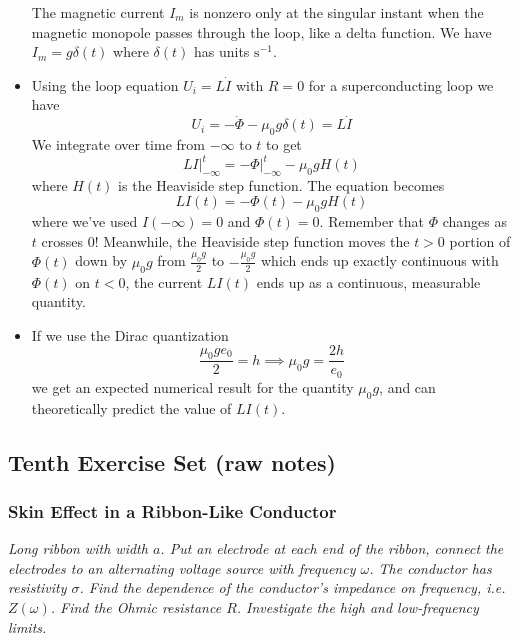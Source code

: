 \documentclass[11pt, a4paper]{article}
\renewcommand{\vec}[1]{\bm{#1}} %
\newcommand{\mm}{\mu_{0}}  %
\newcommand{\m}{\vec{m}}  %
\begin{document}
\begin{itemize}
	The magnetic current $ I_{m} $ is nonzero only at the singular instant when the magnetic monopole passes through the loop, like a delta function. We have $ I_{m} = g \delta (t) $ where $ \delta(t) $ has units $ \si{\second^{-1}} $. 
	
	\item Using the loop equation $ U_{i} = L \dot{I} $ with $ R = 0 $ for a superconducting loop we have
	\begin{equation*}
		U_{i} = - \dot{\Phi} - \mm g \delta (t) = L \dot{I}
	\end{equation*}
	We integrate over time from $ -\infty $ to $ t $ to get
	\begin{equation*}
		LI\big |_{-\infty}^{t} = - \Phi |_{-\infty}^{t} - \mm g H(t)
	\end{equation*}
	where $ H(t) $ is the Heaviside step function. The equation becomes
	\begin{equation*}
		LI(t) = - \Phi(t)  - \mm gH(t)
	\end{equation*}
	where we've used $ I(-\infty) = 0 $ and $ \Phi(t) = 0$. Remember that $ \Phi $ changes as $ t $ crosses $ 0 $! Meanwhile, the Heaviside step function moves the $ t > 0 $ portion of $ \Phi(t) $ down by $ \mm g $ from $ \frac{\mm g}{2} $ to $ -\frac{\mm g}{2} $ which ends up exactly continuous with $ \Phi(t) $ on $ t < 0 $, the current $ LI(t) $ ends up as a continuous, measurable quantity.
	
	\item If we use the Dirac quantization 
	\begin{equation*}
		\frac{\mm g e_{0}}{2} = h \implies \mm g = \frac{2h}{e_{0}}
	\end{equation*}
	we get an expected numerical result for the quantity $ \mm g $, and can theoretically predict the value of $ LI(t) $.
\end{itemize}


\subsection{Tenth Exercise Set (raw notes)}

\subsubsection{Skin Effect in a Ribbon-Like Conductor}
\textit{Long ribbon with width $ a $. Put an electrode at each end of the ribbon, connect the electrodes to an alternating voltage source with frequency $ \omega $. The conductor has resistivity $ \sigma $. Find the dependence of the conductor's impedance on frequency, i.e. $ Z(\omega) $. Find the Ohmic resistance $ R $. Investigate the high and low-frequency limits.}
\end{document}
